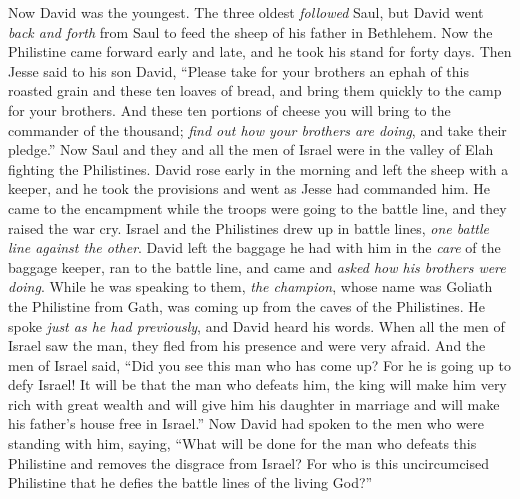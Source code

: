 \begin{biblechapter}
\verse Now David was the youngest. The three oldest \textit{followed} Saul,
\verse but David went \textit{back and forth} from Saul to feed the sheep of his father in Bethlehem.
\verse Now the Philistine came forward early and late, and he took his stand for forty days.
\verse Then Jesse said to his son David, “Please take for your brothers an ephah of this roasted grain and these ten loaves of bread, and bring them quickly to the camp for your brothers.
\verse And these ten portions of cheese you will bring to the commander of the thousand; \textit{find out how your brothers are doing}, and take their pledge.”
\verse Now Saul and they and all the men of Israel were in the valley of Elah fighting the Philistines.
\verse David rose early in the morning and left the sheep with a keeper, and he took the provisions and went as Jesse had commanded him. He came to the encampment while the troops were going to the battle line, and they raised the war cry.
\verse Israel and the Philistines drew up in battle lines, \textit{one battle line against the other}.
\verse David left the baggage he had with him in the \textit{care} of the baggage keeper, ran to the battle line, and came and \textit{asked how his brothers were doing}.
\verse While he was speaking to them, \textit{the champion}, whose name was Goliath the Philistine from Gath, was coming up from the caves of the Philistines. He spoke \textit{just as he had previously}, and David heard his words.
\verse When all the men of Israel saw the man, they fled from his presence and were very afraid.
\verse And the men of Israel said, “Did you see this man who has come up? For he is going up to defy Israel! It will be that the man who defeats him, the king will make him very rich with great wealth and will give him his daughter in marriage and will make his father’s house free in Israel.”
\verse Now David had spoken to the men who were standing with him, saying, “What will be done for the man who defeats this Philistine and removes the disgrace from Israel? For who is this uncircumcised Philistine that he defies the battle lines of the living God?”

\end{biblechapter}
